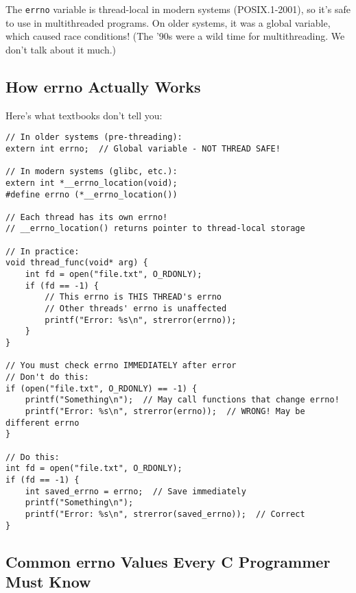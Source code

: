 \begin{notebox}
The \texttt{errno} variable is thread-local in modern systems (POSIX.1-2001), so it's safe to use in multithreaded programs. On older systems, it was a global variable, which caused race conditions! (The '90s were a wild time for multithreading. We don't talk about it much.)
\end{notebox}

\subsection{How errno Actually Works}

Here's what textbooks don't tell you:

\begin{lstlisting}
// In older systems (pre-threading):
extern int errno;  // Global variable - NOT THREAD SAFE!

// In modern systems (glibc, etc.):
extern int *__errno_location(void);
#define errno (*__errno_location())

// Each thread has its own errno!
// __errno_location() returns pointer to thread-local storage

// In practice:
void thread_func(void* arg) {
    int fd = open("file.txt", O_RDONLY);
    if (fd == -1) {
        // This errno is THIS THREAD's errno
        // Other threads' errno is unaffected
        printf("Error: %s\n", strerror(errno));
    }
}

// You must check errno IMMEDIATELY after error
// Don't do this:
if (open("file.txt", O_RDONLY) == -1) {
    printf("Something\n");  // May call functions that change errno!
    printf("Error: %s\n", strerror(errno));  // WRONG! May be different errno
}

// Do this:
int fd = open("file.txt", O_RDONLY);
if (fd == -1) {
    int saved_errno = errno;  // Save immediately
    printf("Something\n");
    printf("Error: %s\n", strerror(saved_errno));  // Correct
}
\end{lstlisting}

\subsection{Common errno Values Every C Programmer Must Know}

